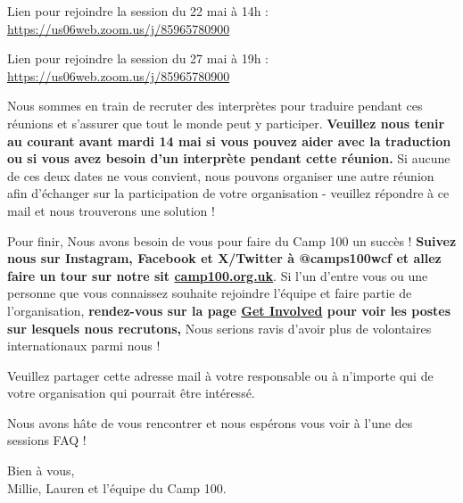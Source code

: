 \documentclass[a4paper, 11pt]{article}
\begin{document}
Lien pour rejoindre la session du 22 mai \`a 14h :\\
\href{https://us06web.zoom.us/j/85965780900}{https://us06web.zoom.us/j/85965780900}

Lien pour rejoindre la session du 27 mai \`a 19h :\\
\href{https://us06web.zoom.us/j/85965780900}{https://us06web.zoom.us/j/85965780900}

Nous sommes en train de recruter des interprètes pour traduire pendant ces r\'eunions et s'assurer que tout le monde peut y participer. \textbf{Veuillez nous tenir au courant avant mardi 14 mai si vous pouvez aider avec la traduction ou si vous avez besoin d'un interprète pendant cette r\'eunion.} Si aucune de ces deux dates ne vous convient, nous pouvons organiser une autre r\'eunion afin d'\'echanger sur la participation de votre organisation - veuillez r\'epondre \`a ce mail et nous trouverons une solution !

Pour finir,  Nous avons besoin de vous pour faire du Camp 100 un succès ! \textbf{Suivez nous sur Instagram, Facebook et X/Twitter \`a @camps100wcf et allez faire un tour sur notre sit \href{https://camp100.org.uk}{camp100.org.uk}}. Si l'un d'entre vous ou une personne que vous connaissez souhaite rejoindre l'\'equipe et faire partie de l'organisation, \textbf{rendez-vous sur la page \href{https://camp100.org.uk/get-involved/}{Get Involved} pour voir les postes sur lesquels nous recrutons,} Nous serions ravis d'avoir plus de volontaires internationaux parmi nous ! 

Veuillez partager cette adresse mail \`a votre responsable ou \`a n'importe qui de votre organisation qui pourrait \^etre int\'eress\'e.

Nous avons hâte de vous rencontrer et nous esp\'erons vous voir \`a l'une des sessions FAQ !

Bien \`a vous, \\
Millie, Lauren et l'\'equipe du Camp 100.


\makedocumentbackpage
\end{document}
